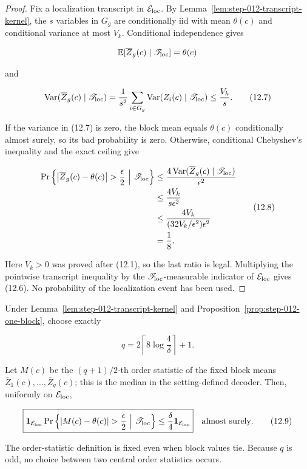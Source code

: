 \begin{proof}
Fix a localization transcript in
\(\mathcal E_{\rm loc}\). By
Lemma~\ref{lem:step-012-transcript-kernel}, the \(s\) variables in
\(G_g\) are conditionally iid with mean \(\theta(c)\) and conditional
variance at most \(V_k\). Conditional independence gives

\[
\mathbb E[\overline Z_g(c)\mid\mathscr T_{\rm loc}]=\theta(c)
\]

and

\[
\operatorname{Var}(\overline Z_g(c)\mid\mathscr T_{\rm loc})
=\frac1{s^2}\sum_{i\in G_g}
\operatorname{Var}(Z_i(c)\mid\mathscr T_{\rm loc})
\leq\frac{V_k}{s}.
\tag{12.7}
\]

If the variance in (12.7) is zero, the block mean equals \(\theta(c)\)
conditionally almost surely, so its bad probability is zero. Otherwise,
conditional Chebyshev's inequality and the exact ceiling give

\[
\begin{aligned}
\Pr\left\{
\left|\overline Z_g(c)-\theta(c)\right|>\frac{\epsilon}{2}
\ \middle|\ \mathscr T_{\rm loc}
\right\}
&\leq
\frac{4\operatorname{Var}(\overline Z_g(c)\mid\mathscr T_{\rm loc})}
{\epsilon^2}\\
&\leq\frac{4V_k}{s\epsilon^2}\\
&\leq\frac{4V_k}
{(32V_k/\epsilon^2)\epsilon^2}\\
&=\frac18.
\end{aligned}
\tag{12.8}
\]

Here \(V_k>0\) was proved after (12.1), so the last ratio is legal.
Multiplying the pointwise transcript inequality by the
\(\mathscr T_{\rm loc}\)-measurable indicator of
\(\mathcal E_{\rm loc}\) gives (12.6). No probability of the localization
event has been used.
\end{proof}

\begin{proposition}\label{prop:step-012-odd-median}
Under Lemma~\ref{lem:step-012-transcript-kernel} and
Proposition~\ref{prop:step-012-one-block}, choose exactly

\[
q=2\left\lceil8\log\frac4\delta\right\rceil+1.
\]

Let \(M(c)\) be the \((q+1)/2\)-th order statistic of the fixed block means
\(\overline Z_1(c),\ldots,\overline Z_q(c)\); this is the median in the
setting-defined decoder. Then, uniformly on \(\mathcal E_{\rm loc}\),

\[
\boxed{
\mathbf1_{\mathcal E_{\rm loc}}
\Pr\left\{
|M(c)-\theta(c)|>\frac{\epsilon}{2}
\ \middle|\ \mathscr T_{\rm loc}
\right\}
\leq\frac{\delta}{4}\mathbf1_{\mathcal E_{\rm loc}}
}
\quad\text{almost surely}.
\tag{12.9}
\]

The order-statistic definition is fixed even when block values tie. Because
\(q\) is odd, no choice between two central order statistics occurs.
\end{proposition}


